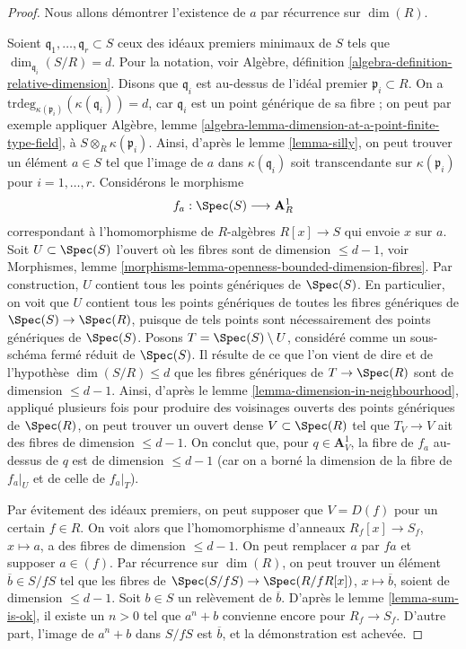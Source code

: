 \begin{proof}
\medskip\noindent
Nous allons démontrer l'existence de $a$ par récurrence sur $\dim(R)$.

\medskip\noindent
Soient $\mathfrak q_1, \ldots, \mathfrak q_r \subset S$ ceux
des idéaux premiers minimaux de $S$ tels que $\dim_{\mathfrak q_i}(S/R) = d$.
Pour la notation, voir
Algèbre, définition \ref{algebra-definition-relative-dimension}.
Disons que $\mathfrak q_i$ est au-dessus de l'idéal premier $\mathfrak p_i \subset R$.
On a $\text{trdeg}_{\kappa(\mathfrak p_i)}(\kappa(\mathfrak q_i)) = d$,
car $\mathfrak q_i$ est un point générique de sa fibre ; on peut par exemple
appliquer Algèbre, lemme \ref{algebra-lemma-dimension-at-a-point-finite-type-field},
à $S \otimes_R \kappa(\mathfrak p_i)$.
Ainsi, d'après le lemme \ref{lemma-silly}, on peut trouver un élément $a \in S$ tel que
l'image de $a$ dans $\kappa(\mathfrak q_i)$ soit transcendante sur
$\kappa(\mathfrak p_i)$ pour $i = 1, \ldots, r$.
Considérons le morphisme
$$
f_a : \Spec(S) \longrightarrow \mathbf{A}^1_R
$$
correspondant à l'homomorphisme de $R$-algèbres $R[x] \to S$
qui envoie $x$ sur $a$. Soit $U \subset \Spec(S)$ l'ouvert
où les fibres sont de dimension $\leq d - 1$, voir
Morphismes, lemme \ref{morphisms-lemma-openness-bounded-dimension-fibres}.
Par construction, $U$ contient tous les points génériques de $\Spec(S)$.
En particulier, on voit que $U$ contient tous les points génériques de
toutes les fibres génériques de $\Spec(S) \to \Spec(R)$, puisque de tels points sont
nécessairement des points génériques de $\Spec(S)$. Posons $T = \Spec(S) \setminus U$,
considéré comme un sous-schéma fermé réduit de $\Spec(S)$.
Il résulte de ce que l'on vient de dire et de l'hypothèse
$\dim(S/R) \leq d$ que
les fibres génériques de $T \to \Spec(R)$ sont de dimension $\leq d - 1$.
Ainsi, d'après le lemme \ref{lemma-dimension-in-neighbourhood},
appliqué plusieurs fois pour produire des voisinages ouverts des points
génériques de $\Spec(R)$, on peut trouver un ouvert dense $V \subset \Spec(R)$ tel que
$T_V \to V$ ait des fibres de dimension $\leq d - 1$.
On conclut que, pour $q \in \mathbf{A}^1_V$, la fibre de
$f_a$ au-dessus de $q$ est de dimension $\leq d - 1$ (car on a borné la dimension
de la fibre de $f_a|_U$ et de celle de $f_a|_T$).

\medskip\noindent
Par évitement des idéaux premiers, on peut supposer que $V = D(f)$ pour un certain $f \in R$.
On voit alors que l'homomorphisme d'anneaux $R_f[x] \to S_f$, $x \mapsto a$,
a des fibres de dimension $\leq d - 1$.
On peut remplacer $a$ par $fa$ et supposer $a \in (f)$.
Par récurrence sur $\dim(R)$, on peut trouver un élément
$\overline{b} \in S/fS$
tel que les fibres de $\Spec(S/fS) \to \Spec(R/fR[x])$,
$x \mapsto \overline{b}$, soient de dimension $\leq d - 1$.
Soit $b \in S$ un relèvement de $\overline{b}$.
D'après le lemme \ref{lemma-sum-is-ok}, il existe un $n > 0$ tel
que $a^n + b$ convienne encore pour $R_f \to S_f$.
D'autre part, l'image de $a^n + b$ dans $S/fS$ est $\overline{b}$,
et la démonstration est achevée.
\end{proof}

